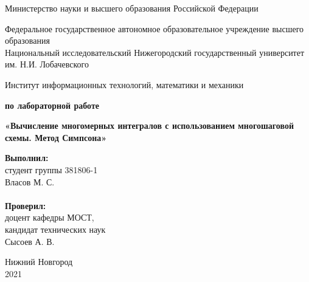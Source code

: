 \documentclass{report}
\begin{document}
\begin{titlepage}

\begin{center}
Министерство науки и высшего образования Российской Федерации
\end{center}

\begin{center}
Федеральное государственное автономное образовательное учреждение высшего образования \\
Национальный исследовательский Нижегородский государственный университет им. Н.И. Лобачевского
\end{center}

\begin{center}
Институт информационных технологий, математики и механики
\end{center}

\vspace{4em}

\begin{center}
\textbf{ по лабораторной работе} \\
\end{center}
\begin{center}
\textbf{\Large«Вычисление многомерных интегралов с использованием многошаговой схемы. Метод Симпсона»} \\
\end{center}

\vspace{4em}

\newbox{\lbox}
\newlength{\maxl}
\setlength{\maxl}{\wd\lbox}
\hfill\parbox{7cm}{
\hspace*{5cm}\hspace*{-5cm}\textbf{Выполнил:} \\ студент группы 381806-1 \\ Власов М. С.\\
\\
\hspace*{5cm}\hspace*{-5cm}\textbf{Проверил:}\\ доцент кафедры МОСТ, \\ кандидат технических наук \\ Сысоев А. В.\\
}
\vspace{\fill}

\begin{center} Нижний Новгород \\ 2021 \end{center}

\end{titlepage}
\end{document}
